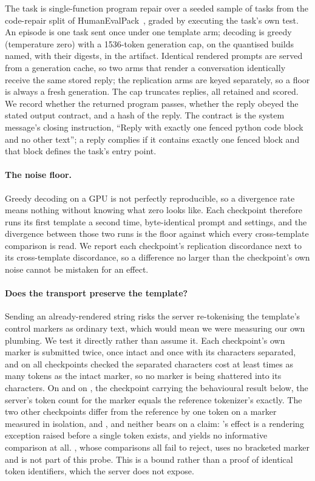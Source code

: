 The task is single-function program repair over a seeded sample of \NTasksExec{} tasks from the
code-repair split of HumanEvalPack~\cite{muennighoff2024octopack}, graded by executing the task's
own test. An episode is one task sent once under one template arm; decoding is greedy (temperature
zero) with a 1536-token generation cap, on the quantised builds
named, with their digests, in the artifact. Identical rendered prompts are served from a
generation cache, so two arms that render a conversation identically receive the same stored
reply; the replication arms are keyed separately, so a floor is always a fresh generation. The cap
truncates \NExecTruncated{} replies, all retained and
scored. We record whether the returned program passes, whether the reply obeyed the
stated output contract, and a hash of the reply. The contract is the system message's closing
instruction, ``Reply with exactly one fenced python code block and no other text''; a reply
complies if it contains exactly one fenced block and that block defines the task's entry point.

\paragraph{The noise floor.} Greedy decoding on a GPU is not perfectly reproducible, so a divergence
rate means nothing without knowing what zero looks like. Each checkpoint therefore runs its first
template a second time, byte-identical prompt and settings, and the divergence between those two
runs is the floor against which every cross-template comparison is read. We report each checkpoint's
replication discordance next to its cross-template discordance, so a difference no larger than the
checkpoint's own noise cannot be mistaken for an effect.

\paragraph{Does the transport preserve the template?} Sending an already-rendered string risks the
server re-tokenising the template's control markers as ordinary text, which would mean we were
measuring our own plumbing. We test it directly rather than assume it. Each checkpoint's own marker
is submitted twice, once intact and once with its characters separated, and on all
\NMarkersChecked{} checkpoints checked the separated characters cost at least \MarkerMinRatio{}
times as many tokens as the intact marker, so no marker is being shattered into its characters. On \ShortQwen{} and
on \ShortPhi{}, the checkpoint carrying the behavioural result below,
the server's token count for the marker equals the reference tokenizer's exactly. The two other
checkpoints differ from the reference by one token on a marker measured in isolation, \ShortMistral{}
and \ShortLlama{}, and neither bears on a claim: \ShortMistral's effect is a rendering exception
raised before a single token exists, and \ShortLlama{} yields no informative comparison at all.
\ShortDS{}, whose comparisons all fail to reject,
uses no bracketed marker and is not part of this
probe. This is a bound rather than a proof of identical token identifiers, which the server does not
expose.

